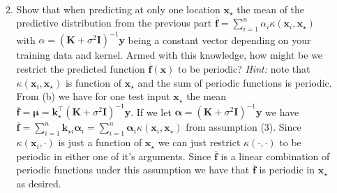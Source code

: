 \documentclass[letter, 12pt]{article}
\begin{document}
\begin{enumerate}
\begin{enumerate}
\begin{align*}
            \end{align*}
            \vfill
        \item Show that when predicting at only one location $\mathbf{x}_\star$ the
            mean of the predictive distribution from the previous part
            $\overline{\mathbf{f}} = \sum_{i=1}^n \alpha_i
            \kappa(\mathbf{x}_i,\mathbf{x}_\star)$ with $\alpha = (\mathbf{K} + \sigma^2
            \mathbf{I})^{-1}\mathbf{y}$ being a constant vector depending on your training
            data and kernel. Armed with this knowledge, how might be we restrict
            the predicted function $\overline{\mathbf{f}}(\mathbf{x})$ to be periodic?
            \textit{Hint:} note that $\kappa(\mathbf{x}_i,\mathbf{x}_\star)$ is function of
            $\mathbf{x}_\star$ and the sum of periodic functions is periodic.\\[1em]
            From (b) we have for one test input $\mathbf{x}_\star$ the mean $\overline{\mathbf{f}} =
            \boldsymbol{\mu} = \mathbf{k}_\star^\top\left(\mathbf{K} + \sigma^2 \mathbf{I}\right)^{-1}\mathbf{y}$.
            If we let $\boldsymbol{\alpha} = \left(\mathbf{K} + \sigma^2\mathbf{I}\right)^{-1}\mathbf{y}$
            we have $\overline{\mathbf{f}} = \sum_{i=1}^n \mathbf{k}_{\star i}\boldsymbol{\alpha}_i =
            \sum_{i=1}^n \boldsymbol{\alpha}_i\kappa(\mathbf{x}_i,\mathbf{x}_\star)$ from assumption (3).
            Since $\kappa(\mathbf{x}_i,\cdot)$ is just a function of $\mathbf{x}_\star$ we can just restrict
            $\kappa(\cdot,\cdot)$ to be periodic in either one of it's arguments. Since $\overline{\mathbf{f}}$
            is a linear combination of periodic functions under this assumption we have that $\overline{\mathbf{f}}$
            is periodic in $\mathbf{x}_\star$ as desired.
            \vfill
    \end{enumerate}
    \clearpage
\end{enumerate}
\end{document}
